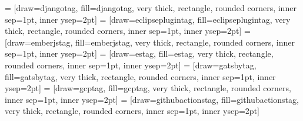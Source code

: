  = [draw=djangotag, fill=djangotag, very thick, rectangle, rounded corners, inner sep=1pt, inner ysep=2pt]
\newcommand{\djangotag}{\begin{tikzpicture}\node [djangotag] (box){{\scriptsize \color{white}{\textbf{\phantom{|}Django\phantom{|}}}}};\end{tikzpicture}}
 = [draw=eclipseplugintag, fill=eclipseplugintag, very thick, rectangle, rounded corners, inner sep=1pt, inner ysep=2pt]
\newcommand{\eclipseplugintag}{\begin{tikzpicture}\node [eclipseplugintag] (box){{\scriptsize \textbf{\phantom{|}Plugin Eclipse\phantom{|}}}};\end{tikzpicture}}
 = [draw=emberjstag, fill=emberjstag, very thick, rectangle, rounded corners, inner sep=1pt, inner ysep=2pt]
\newcommand{\emberjstag}{\begin{tikzpicture}\node [emberjstag] (box){{\scriptsize \color{white}{\textbf{\phantom{|}EmberJS\phantom{|}}}}};\end{tikzpicture}}
 = [draw=estag, fill=estag, very thick, rectangle, rounded corners, inner sep=1pt, inner ysep=2pt]
\newcommand{\estag}{\begin{tikzpicture}\node [estag] (box){{\scriptsize \textbf{\phantom{|}ElasticSearch\phantom{|}}}};\end{tikzpicture}}
 = [draw=gatsbytag, fill=gatsbytag, very thick, rectangle, rounded corners, inner sep=1pt, inner ysep=2pt]
\newcommand{\gatsbytag}{\begin{tikzpicture}\node [gatsbytag] (box){{\scriptsize \color{white}{\textbf{\phantom{|}Gatsby\phantom{|}}}}};\end{tikzpicture}}
 = [draw=gcptag, fill=gcptag, very thick, rectangle, rounded corners, inner sep=1pt, inner ysep=2pt]
\newcommand{\gcptag}{\begin{tikzpicture}\node [gcptag] (box){{\scriptsize \color{white}{\textbf{\phantom{|}GCP\phantom{|}}}}};\end{tikzpicture}}
 = [draw=githubactionstag, fill=githubactionstag, very thick, rectangle, rounded corners, inner sep=1pt, inner ysep=2pt]
